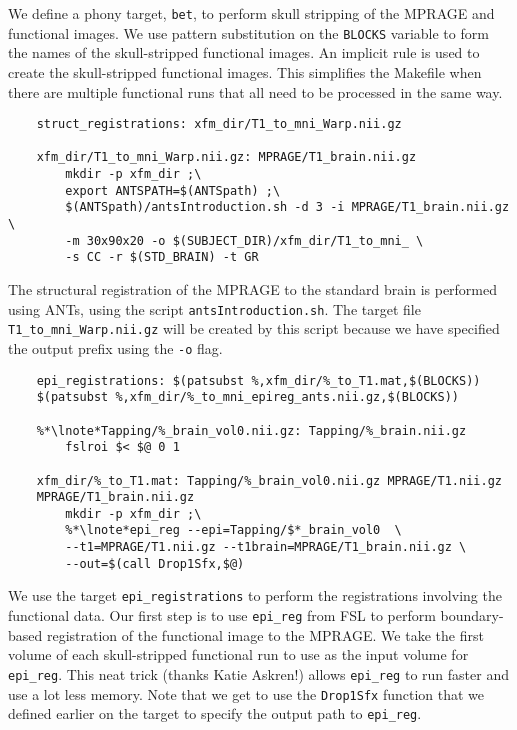 We define a phony target, \texttt{bet}, to perform skull stripping of
the MPRAGE and functional images.  We use pattern substitution
on the \texttt{BLOCKS} variable to form the names of the
skull-stripped functional images.  An implicit rule is used to
create the skull-stripped functional images. This simplifies the
Makefile when there are multiple functional runs that all need to be
processed in the same way.

\begin{lstlisting}
	struct_registrations: xfm_dir/T1_to_mni_Warp.nii.gz

	xfm_dir/T1_to_mni_Warp.nii.gz: MPRAGE/T1_brain.nii.gz 
		mkdir -p xfm_dir ;\
		export ANTSPATH=$(ANTSpath) ;\
		$(ANTSpath)/antsIntroduction.sh -d 3 -i MPRAGE/T1_brain.nii.gz \
		-m 30x90x20 -o $(SUBJECT_DIR)/xfm_dir/T1_to_mni_ \
		-s CC -r $(STD_BRAIN) -t GR
\end{lstlisting}
The structural registration of the MPRAGE to the standard brain is
performed using ANTs, using the script
\texttt{antsIntroduction.sh}. The target file
\texttt{T1_to_mni_Warp.nii.gz} will be created by this script because
we have specified the output prefix using the \texttt{-o} flag.

\begin{lstlisting}
	epi_registrations: $(patsubst %,xfm_dir/%_to_T1.mat,$(BLOCKS)) 
	$(patsubst %,xfm_dir/%_to_mni_epireg_ants.nii.gz,$(BLOCKS))

	%*\lnote*Tapping/%_brain_vol0.nii.gz: Tapping/%_brain.nii.gz
		fslroi $< $@ 0 1

	xfm_dir/%_to_T1.mat: Tapping/%_brain_vol0.nii.gz MPRAGE/T1.nii.gz 
	MPRAGE/T1_brain.nii.gz
		mkdir -p xfm_dir ;\
		%*\lnote*epi_reg --epi=Tapping/$*_brain_vol0  \
		--t1=MPRAGE/T1.nii.gz --t1brain=MPRAGE/T1_brain.nii.gz \
		--out=$(call Drop1Sfx,$@)
\end{lstlisting}
We use the target \texttt{epi_registrations} to perform the
registrations involving the functional data. Our first step is to use
\texttt{epi_reg} from FSL to perform boundary-based registration of
the functional image to the MPRAGE. \lnum{8} We take the
first volume of each skull-stripped functional run to use as the input
volume for \texttt{epi_reg}. This neat trick (thanks Katie Askren!)
allows \texttt{epi_reg} to run faster and use a lot less
memory. \lnum{9} Note that we get to use the \texttt{Drop1Sfx}
function that we defined earlier on the target to specify the output
path to \texttt{epi_reg}.


